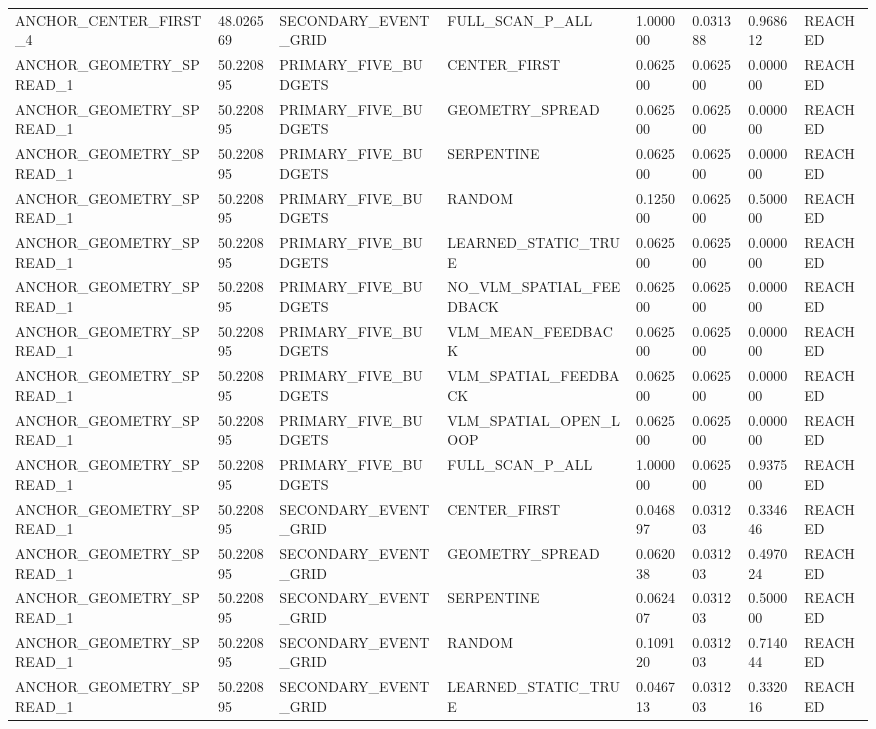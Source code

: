 \begin{tabular}{llllllll}
ANCHOR\_CENTER\_FIRST\_4 & 48.026569 & SECONDARY\_EVENT\_GRID & FULL\_SCAN\_P\_ALL & 1.000000 & 0.031388 & 0.968612 & REACHED \\
ANCHOR\_GEOMETRY\_SPREAD\_1 & 50.220895 & PRIMARY\_FIVE\_BUDGETS & CENTER\_FIRST & 0.062500 & 0.062500 & 0.000000 & REACHED \\
ANCHOR\_GEOMETRY\_SPREAD\_1 & 50.220895 & PRIMARY\_FIVE\_BUDGETS & GEOMETRY\_SPREAD & 0.062500 & 0.062500 & 0.000000 & REACHED \\
ANCHOR\_GEOMETRY\_SPREAD\_1 & 50.220895 & PRIMARY\_FIVE\_BUDGETS & SERPENTINE & 0.062500 & 0.062500 & 0.000000 & REACHED \\
ANCHOR\_GEOMETRY\_SPREAD\_1 & 50.220895 & PRIMARY\_FIVE\_BUDGETS & RANDOM & 0.125000 & 0.062500 & 0.500000 & REACHED \\
ANCHOR\_GEOMETRY\_SPREAD\_1 & 50.220895 & PRIMARY\_FIVE\_BUDGETS & LEARNED\_STATIC\_TRUE & 0.062500 & 0.062500 & 0.000000 & REACHED \\
ANCHOR\_GEOMETRY\_SPREAD\_1 & 50.220895 & PRIMARY\_FIVE\_BUDGETS & NO\_VLM\_SPATIAL\_FEEDBACK & 0.062500 & 0.062500 & 0.000000 & REACHED \\
ANCHOR\_GEOMETRY\_SPREAD\_1 & 50.220895 & PRIMARY\_FIVE\_BUDGETS & VLM\_MEAN\_FEEDBACK & 0.062500 & 0.062500 & 0.000000 & REACHED \\
ANCHOR\_GEOMETRY\_SPREAD\_1 & 50.220895 & PRIMARY\_FIVE\_BUDGETS & VLM\_SPATIAL\_FEEDBACK & 0.062500 & 0.062500 & 0.000000 & REACHED \\
ANCHOR\_GEOMETRY\_SPREAD\_1 & 50.220895 & PRIMARY\_FIVE\_BUDGETS & VLM\_SPATIAL\_OPEN\_LOOP & 0.062500 & 0.062500 & 0.000000 & REACHED \\
ANCHOR\_GEOMETRY\_SPREAD\_1 & 50.220895 & PRIMARY\_FIVE\_BUDGETS & FULL\_SCAN\_P\_ALL & 1.000000 & 0.062500 & 0.937500 & REACHED \\
ANCHOR\_GEOMETRY\_SPREAD\_1 & 50.220895 & SECONDARY\_EVENT\_GRID & CENTER\_FIRST & 0.046897 & 0.031203 & 0.334646 & REACHED \\
ANCHOR\_GEOMETRY\_SPREAD\_1 & 50.220895 & SECONDARY\_EVENT\_GRID & GEOMETRY\_SPREAD & 0.062038 & 0.031203 & 0.497024 & REACHED \\
ANCHOR\_GEOMETRY\_SPREAD\_1 & 50.220895 & SECONDARY\_EVENT\_GRID & SERPENTINE & 0.062407 & 0.031203 & 0.500000 & REACHED \\
ANCHOR\_GEOMETRY\_SPREAD\_1 & 50.220895 & SECONDARY\_EVENT\_GRID & RANDOM & 0.109120 & 0.031203 & 0.714044 & REACHED \\
ANCHOR\_GEOMETRY\_SPREAD\_1 & 50.220895 & SECONDARY\_EVENT\_GRID & LEARNED\_STATIC\_TRUE & 0.046713 & 0.031203 & 0.332016 & REACHED \\

\end{tabular}

